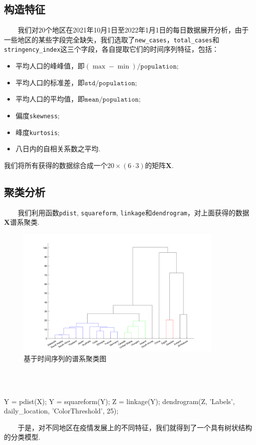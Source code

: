 \documentclass[a4paper, titlepage]{article}
\begin{document}
    \subsection{构造特征}
    　　我们对$20$个地区在2021年10月1日至2022年1月1日的每日数据展开分析，由于一些地区的某些字段完全缺失，我们选取了\texttt{new\_cases}，\texttt{total\_cases}和\texttt{stringency\_index}这三个字段，各自提取它们的时间序列特征，包括：
    \begin{itemize}
        \item 平均人口的峰峰值，即$(\max-\min)/\texttt{population}$;
        \item 平均人口的标准差，即$\texttt{std}/\texttt{population}$;
        \item 平均人口的平均值，即$\texttt{mean}/\texttt{population}$;
        \item 偏度\texttt{skewness};
        \item 峰度\texttt{kurtosis};
        \item 八日内的自相关系数之平均.
    \end{itemize}
    我们将所有获得的数据综合成一个$20\times (6\cdot 3)$的矩阵$\bm{X}$.
    \subsection{聚类分析}
    　　我们利用函数\texttt{pdist}, \texttt{squareform}, \texttt{linkage}和\texttt{dendrogram}，对上面获得的数据$\bm{X}$谱系聚类.\\
    \begin{minipage}{\textwidth}
        \begin{figure}[H]
            \centering
            \includegraphics[width=0.9\textwidth]{./images/Tree_2.png}
            \vspace{-1em}
            \caption{基于时间序列的谱系聚类图}
            \label{images:Tree}
        \end{figure}
    \end{minipage}\\\quad\\
\begin{matlabcode}
Y = pdist(X);
Y = squareform(Y);
Z = linkage(Y);
dendrogram(Z, 'Labels', daily_location, 'ColorThreshold', 25);
\end{matlabcode}
    　　于是，对不同地区在疫情发展上的不同特征，我们就得到了一个具有树状结构的分类模型. 
\end{document}
